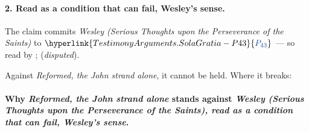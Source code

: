 \documentclass[11pt]{article}
\newcommand{\pvar}[2]{\hyperlink{#1-P#2}{\textcolor{claimlink}{P_{#2}}}}
\begin{document}
\paragraph{2. Read as a condition that can fail, Wesley’s sense.} The claim commits \emph{Wesley (Serious Thoughts upon the Perseverance of the Saints)} to \(\pvar{TestimonyArguments.SolaGratia}{43}\) --- so read by \cite[439]{wesley-works-9-1827}; \cite[444--445]{wesley-works-9-1827} (\emph{disputed}).

Against \emph{Reformed, the John strand alone}, it cannot be held. Where it breaks:
\paragraph{Why \emph{Reformed, the John strand alone} stands against \emph{Wesley (Serious Thoughts upon the Perseverance of the Saints), read as a condition that can fail, Wesley’s sense}.}
\end{document}
